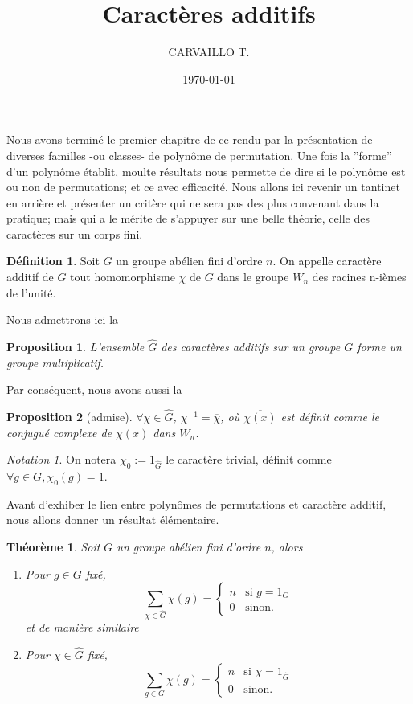 \documentclass[12pt]{article}
\title{Caractères additifs}
\author{CARVAILLO T.}
\date{\today}
\newtheorem{prop}{Proposition}
\newtheorem{thm}{Théorème}
\theoremstyle{definition}\newtheorem{defn}{Définition}
\theoremstyle{definition}\newtheorem{exm}{Exemple}
\theoremstyle{definition}\newtheorem{rem}{Remarque}
\theoremstyle{definition}\newtheorem{algo}{Algorithme}
\theoremstyle{remark}\newtheorem{exo}{Exercice}
\theoremstyle{remark}\newtheorem{note}{Note}
\theoremstyle{remark}\newtheorem{nota}{Notation}
\begin{document}
Nous avons terminé le premier chapitre de ce rendu par la présentation de diverses familles -ou classes- de polynôme de permutation. Une fois la ''forme'' d'un polynôme établit, moulte résultats nous permette de dire si le polynôme est ou non de permutations; et ce avec efficacité. \newline
Nous allons ici revenir un tantinet en arrière et présenter un critère qui ne sera pas des plus convenant dans la pratique; mais qui a le mérite de s'appuyer sur une belle théorie, celle des caractères sur un corps fini.

\begin{defn}
Soit $G$ un groupe abélien fini d'ordre $n$. On appelle caractère additif de $G$ tout homomorphisme $\chi$ de $G$ dans le groupe $W_n$ des racines n-ièmes de l'unité.
\end{defn}

Nous admettrons ici la 

\begin{prop}
L'ensemble $\hat{G}$ des caractères additifs sur un groupe $G$ forme un groupe multiplicatif.
\end{prop}

Par conséquent, nous avons aussi la 

\begin{prop}[admise]
$\forall \chi \in \hat{G}$, $\chi^{-1} = \overline{\chi}$, où $\overline{\chi(x)}$ est définit comme le conjugué complexe de $\chi(x)$ dans $W_n$.
\end{prop}

\begin{nota}
On notera $ \chi_0 := 1_{\hat{G}}$  le caractère trivial, définit comme $\forall g \in G, \chi_0(g) = 1$.
\end{nota}

Avant d'exhiber le lien entre polynômes de permutations et caractère additif, nous allons donner un résultat élémentaire.

\begin{thm}
Soit $G$ un groupe abélien fini d'ordre $n$, alors
	\begin{enumerate}[label = \roman*)]
		\item Pour $g \in G$ fixé,   
				$$
				\displaystyle\sum_{\chi \in \hat{G}} \chi(g) = \left\{
				    \begin{array}{ll}
				        n & \mbox{si } g = 1_G \\
				        0 & \mbox{sinon.}
				    \end{array}
				\right.
				$$
et de manière similaire
		\item Pour $\chi \in \hat{G}$ fixé,
				$$
				\displaystyle\sum_{g \in G} \chi(g) = \left\{
				    \begin{array}{ll}
				        n & \mbox{si } \chi = 1_{\hat{G}} \\
				        0 & \mbox{sinon.}
				    \end{array}
				\right.
				$$						
	\end{enumerate}
\end{thm}
\end{document}
